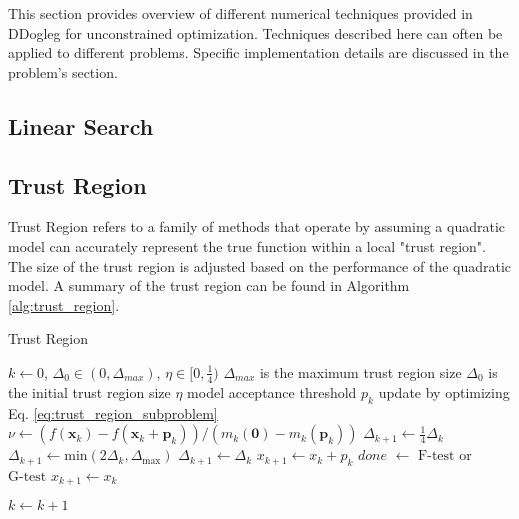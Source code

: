 \documentclass[peerreview,onecolumn]{IEEEtran}
\newcommand{\norm}[1]{\left\lVert#1\right\rVert}
\begin{document}
This section provides overview of different numerical techniques provided in DDogleg for unconstrained optimization. Techniques described here can often be applied to different problems. Specific implementation details are discussed in the problem's section.
\subsection{Linear Search}

\subsection{Trust Region}
Trust Region refers to a family of methods that operate by assuming a quadratic model can accurately represent the true function within a local "trust region". The size of the trust region is adjusted based on the performance of the quadratic model. A summary of the trust region can be found in Algorithm \ref{alg:trust_region}.

\begin{algorithm}{}
\caption{\label{alg:trust_region}Trust Region}
\begin{algorithmic}[1]
	\State $k \gets 0$, $\Delta_0 \in (0,\Delta_{max})$, $\eta \in [0,\frac{1}{4})$
	\State \quad $\Delta_{max}$ is the maximum trust region size
	\State \quad $\Delta_{0}$ is the initial trust region size
	\State \quad $\eta$ model acceptance threshold
	\State $p_k$ update by optimizing Eq. \ref{eq:trust_region_subproblem}
	\State $\nu \gets (f(\bm{x}_k) - f(\bm{x}_k + \bm{p}_k))/(m_k(\bm{0})-m_k(\bm{p}_k))$
	 
		\State $\Delta_{k+1} \gets \frac{1}{4}\Delta_k$
	\Else
		\If{$\nu>\frac{3}{4}$ and $\norm{p_k}=\Delta_k$}
			\State $\Delta_{k+1} \gets \mbox{min}(2\Delta_k,\Delta_{\mbox{max}})$
		\Else
			\State $\Delta_{k+1} \gets \Delta_k$
		\EndIf
	\EndIf
	\If{$\nu > \eta$} 
		\State $x_{k+1} \gets x_k + p_k$
		\State $done$ $\gets$ $\mbox{F-test}$ or $\mbox{G-test}$ 
	\Else
		\State $x_{k+1} \gets x_k$
	\EndIf

	\State $k \gets k + 1$
	\EndWhile
\end{algorithmic}
\end{algorithm}
\end{document}
